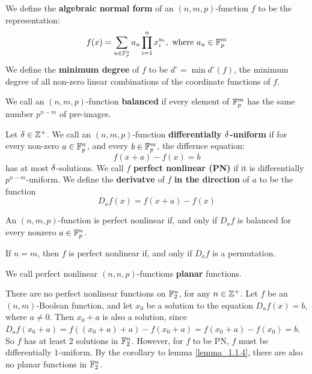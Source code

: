 \begin{definition}
  We define the \textbf{algebraic normal form} of an $(n,m,p)$-function $f$ to
  be the representation:
  \begin{equation}\label{equation_1.7}
    f(x)=\sum_{u \in \mathbb{F}_p^n}{a_u\prod_{i=1}^nx_i^{u_i}}, \text{ where }
    a_u \in \mathbb{F}_p^m
  \end{equation}
  We define the \textbf{minimum degree} of $f$ to be
  $d^\circ=\min{d^\circ(f)}$, the minimum degree of all non-zero linear
  combinations of the coordinate functions of $f$.
\end{definition}

\begin{definition}
  We call an $(n,m,p)$-function \textbf{balanced} if every element of $\mathbb{F}_p^m$
  has the same number $p^{n-m}$ of pre-images.
\end{definition}

\begin{defition}
  Let $\delta \in \mathbb{Z}^+$. We call an $(n,m,p)$-function \textbf{differentially
  $\delta$-uniform} if for every non-zero $a \in \mathbb{F}_p^n$, and every $b \in \mathbb{F}_p^m$,
  the differnce equation:
  \begin{equation}\label{equation_1.8}
    f(x+a)-f(x)=b
  \end{equation}
  has at most $\delta$-solutions. We call $f$ \textbf{perfect nonlinear (PN)} if it
  is differentially $p^{n-m}$-uniform. We define the \textbf{derivatve} of $f$
  \textbf{in the direction} of $a$ to be the function
  \begin{equation*}
    D_a{f(x)}=f(x+a)-f(x)
  \end{equation*}
\end{defition}

\begin{lemma}\label{lemma_1.1.4}
  An $(n,m,p)$-function is perfect nonlinear if, and only if $D_a{f}$ is
  balanced for every nonzero $a \in \mathbb{F}_p^n$.
\end{lemma}
\begin{corollary}
  If $n=m$, then $f$ is perfect nonlinear if, and only if $D_a{f}$ is a
  permutation.
\end{corollary}

\begin{definition}
  We call perfect nonlinear $(n,n,p)$-functions \textbf{planar} functions.
\end{definition}

\begin{example}
  There are no perfect nonlinear functions on $\mathbb{F}_2^n$, for any $n \in \mathbb{Z}^+$. Let
  $f$ be an $(n,m)$-Boolean function, and let $x_0$ be a solution to the equation
  $D_a{f(x)}=b$, where $a \neq 0$. Then $x_0+a$ is also a solution, since
  $D_a{f(x_0+a)}=f((x_0+a)+a)-f(x_0+a)=f(x_0+a)-f(x_0)=b$. So $f$ has at least
  $2$ solutions in $\mathbb{F}_2^n$. However, for  $f$ to be PN, $f$ must be
  differentially $1$-uniform. By the corollary to lemma \ref{lemma_1.1.4}, there
  are also no planar functions in $\mathbb{F}_2^n$.
\end{example}

